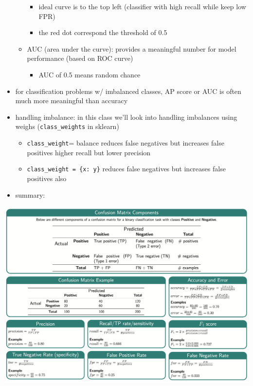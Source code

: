 \documentclass[10.5pt,a4paper, fleqn, dvipsnames]{article}
\begin{document}
\begin{itemize}
\begin{itemize}
        \begin{itemize}
            \item ideal curve is to the top left (classifier with high recall while keep low FPR)
            \item the red dot correspond the threshold of 0.5
        \end{itemize}
        \item AUC (area under the curve): provides a meaningful number for model performance (based on ROC curve)
        \begin{itemize}[leftmargin = 2em]
            \item AUC of 0.5 means random chance 
        \end{itemize}
    \end{itemize}
    \item for classification problems w/ imbalanced classes, AP score or AUC is often much more meaningful than accuracy
    \item handling imbalance: in this class we'll look into handling imbalances using weighs (\lstinline{class_weights} in sklearn)
    \begin{itemize}
        \item \lstinline{class_weight}= balance reduces false negatives but increases false positives higher recall but lower precision
       \item \lstinline!class_weight = {x: y}! reduces false negatives but increases false positives also
    \end{itemize}
    \newpage 
    \item summary:
\end{itemize}
    \includegraphics[scale = 0.37]{evaluation-metrics.png}
\end{document}
